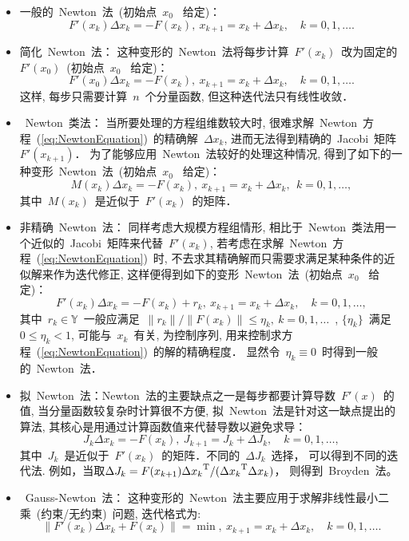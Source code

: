 \begin{itemize}
\item
一般的~Newton~法~(初始点~$x_0$~ 给定)：
$$
F'(x_k) \Delta x_k = -F(x_k),\ x_{k+1} = x_k + \Delta x_k, \quad k =
0,1,\ldots.
$$
\item
简化~Newton~法：
这种变形的~Newton~法将每步计算~$F'(x_k)$~改为固定的~$F'(x_0)$~(初始点~$x_0$~
给定)：
$$
F'(x_0) \Delta x_k = -F(x_k),\ x_{k+1} = x_k + \Delta x_k,\quad k =
0,1,\ldots.
$$
这样, 每步只需要计算~$n$~个分量函数, 但这种迭代法只有线性收敛．
\item
~Newton~类法： 当所要处理的方程组维数较大时,
很难求解~Newton~方程~(\ref{eq:NewtonEquation})~的精确解~$\Delta
x_k$, 进而无法得到精确的~Jacobi~矩阵~$F'(x_{k+1})$．
为了能够应用~Newton~法较好的处理这种情况,
得到了如下的一种变形~Newton~法~(初始点~$x_0$~ 给定)：
\begin{equation}
\label{it:NML_general} M(x_k)\Delta x_k = -F(x_k),\ x_{k+1} = x_k +
\Delta x_k,\ \ k = 0,1,\ldots,
\end{equation}
其中~$M(x_k)$~是近似于~$F'(x_k)$~的矩阵．
\item
非精确~Newton~法： 同样考虑大规模方程组情形,
相比于~Newton~类法用一个近似的~Jacobi~矩阵来代替~$ F'(x_k)$,
若考虑在求解~Newton~方程~(\ref{eq:NewtonEquation})~时,
不去求其精确解而只需要求满足某种条件的近似解来作为迭代修正,
这样便得到如下的变形~Newton~法~(初始点~$x_0$~ 给定)：
\begin{equation}
\label{it:INM_BanachSpace} F'(x_k) \Delta x_k = -F(x_k) + r_k,\
x_{k+1} = x_k + \Delta x_k,\quad k = 0,1,\ldots,
\end{equation}
其中~$r_k \in \mathbb{Y}$~一般应满足~$\|r_k\|/\|F(x_k)\|\leqslant
\eta_k,\ k= 0,1,\ldots$~, $\{\eta_k\}$~满足~$0\leqslant \eta_k <1$,
可能与~$x_k$~有关, 为控制序列,
用来控制求方程~(\ref{eq:NewtonEquation})~的解的精确程度．
显然令~$\eta_k \equiv 0$~时得到一般的~Newton~法．
\item
拟~Newton~法：Newton~法的主要缺点之一是每步都要计算导数~$F'(x)$~的值,
当分量函数较复杂时计算很不方便,
拟~Newton~法是针对这一缺点提出的算法,
其核心是用通过计算函数值来代替导数以避免求导：
$$
J_k \Delta x_k = -F(x_k), \ J_{k+1} = J_k + \Delta J_k,\quad k =
0,1,\ldots,
$$
其中~$J_k$~是近似于~$F'(x_k)$~的矩阵．不同的~$\Delta J_k$~选择，
可以得到不同的迭代法. 例如，当取$\Delta J_k = F(x_{k+1}){\Delta
x_k}^\mathrm{T}/({\Delta x_k}^\mathrm{T}\Delta x_k)$， 则得到~Broyden~法。
\item
~Gauss-Newton~法：
这种变形的~Newton~法主要应用于求解非线性最小二乘~(约束/无约束)~问题,
迭代格式为:
\begin{equation}
\label{it:GNM_BanachSpace} \|F'(x_k)\Delta x_k + F(x_k)\| = \min,\
x_{k+1} = x_k + \Delta x_k,\quad k = 0,1,\ldots.
\end{equation}
\end{itemize}




